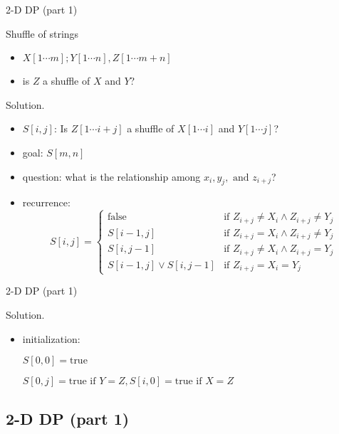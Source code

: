 \begin{frame}{2-D DP (part 1)}
  \begin{exampleblock}{Shuffle of strings }
    \begin{itemize}
      \item $X[1 \cdots m]; Y[1 \cdots n], Z[1 \cdots m+n]$
      \item is $Z$ a shuffle of $X$ and $Y$?
    \end{itemize}
  \end{exampleblock}

  \begin{block}{Solution.}
    \begin{itemize}
      \item $S[i,j]$: Is $Z[1 \cdots i+j]$ a shuffle of $X[1 \cdots i]$ and $Y[1 \cdots j]$?
      \item goal: $S[m,n]$
      \item question: what is the relationship among $x_{i}, y_{j}, \text{ and } z_{i+j}$?
      \item recurrence:
	\begin{displaymath}
	  S[i,j] = \left\{ \begin{array}{ll}
	    \text{false} & \textrm{if $Z_{i+j} \neq X_{i} \land Z_{i+j} \neq Y_{j}$}\\
	    S[i-1,j] & \textrm{if $Z_{i+j} = X_{i} \land Z_{i+j} \neq Y_{j}$}\\
	    S[i,j-1] & \textrm{if $Z_{i+j} \neq X_{i} \land Z_{i+j} = Y_{j}$}\\
	    S[i-1,j] \lor S[i,j-1] & \textrm{if $Z_{i+j} = X_{i} = Y_{j}$}
	  \end{array} \right.
	\end{displaymath}
    \end{itemize}
  \end{block}
\end{frame}
\begin{frame}{2-D DP (part 1)}
  \begin{block}{Solution.}
    \begin{itemize}
      \item initialization: 
	
	$S[0,0] = \text{true}$ 
	
	$S[0,j] = \textrm{true if } Y = Z, S[i,0] = \textrm{true if } X = Z$
    \end{itemize}
  \end{block}
\end{frame}
\subsection{2-D DP (part 1)}

